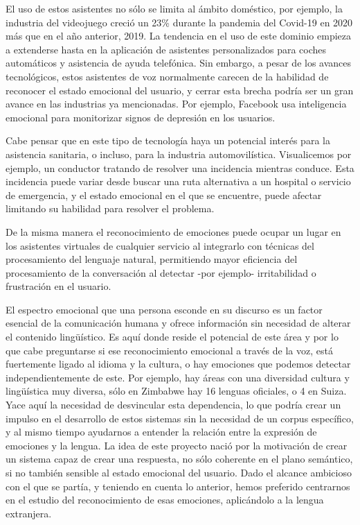 \documentclass[11pt,a4paper,spanish]{book}
\begin{document}
	El uso de estos asistentes no sólo se limita al ámbito doméstico, por ejemplo, la industria del videojuego creció un 23\% durante la pandemia del Covid-19 en 2020 más que en el año anterior, 2019. La tendencia en el uso de este dominio empieza a extenderse hasta en la aplicación de asistentes personalizados para coches automáticos y asistencia de ayuda telefónica. 
	Sin embargo, a pesar de los avances tecnológicos, estos asistentes de voz normalmente carecen de la habilidad de reconocer el estado emocional del usuario, y cerrar esta brecha podría ser un gran avance en las industrias ya mencionadas. Por ejemplo, Facebook usa inteligencia emocional para monitorizar signos de depresión en los usuarios.
	
	Cabe pensar que en este tipo de tecnología haya un potencial interés para la asistencia sanitaria, o incluso, para la industria automovilística. Visualicemos por ejemplo, un conductor tratando de resolver una incidencia mientras conduce. Esta incidencia puede variar desde buscar una ruta alternativa a un hospital o servicio de emergencia, y el estado emocional en el que se encuentre, puede afectar limitando su habilidad para resolver el problema. 
	
	De la misma manera el reconocimiento de emociones puede ocupar un lugar en los asistentes virtuales de cualquier servicio al integrarlo con técnicas del procesamiento del lenguaje natural, permitiendo mayor eficiencia del procesamiento de la conversación al detectar -por ejemplo-  irritabilidad o frustración en el usuario. 
	
	El espectro emocional que una persona esconde en su discurso es un factor esencial de la comunicación humana y ofrece información sin necesidad de alterar el contenido lingüístico. Es aquí donde reside el potencial de este área y por lo que cabe preguntarse si ese reconocimiento emocional a través de la voz, está fuertemente ligado al idioma y la cultura, o hay emociones que podemos detectar independientemente de este. Por ejemplo, hay áreas con una diversidad cultura y lingüística muy diversa, sólo en Zimbabwe hay 16 lenguas oficiales, o 4 en Suiza. Yace aquí la necesidad de desvincular esta dependencia, lo que podría crear un impulso en el desarrollo de estos sistemas sin la necesidad de un corpus específico, y al mismo tiempo ayudarnos a entender la relación entre la expresión de emociones y la lengua.
	La idea de este proyecto nació por la motivación de crear un sistema capaz de crear una respuesta, no sólo coherente en el plano semántico, si no también sensible al estado emocional del usuario. Dado el alcance ambicioso con el que se partía, y teniendo en cuenta lo anterior, hemos preferido centrarnos en el estudio del reconocimiento de esas emociones, aplicándolo a la lengua extranjera.
 
\end{document}
